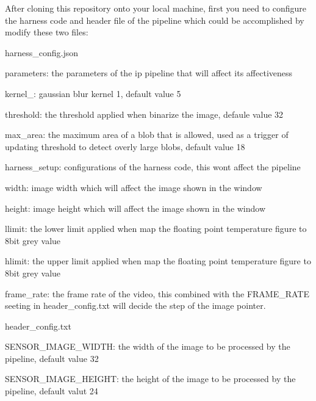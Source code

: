 After cloning this repository onto your local machine, first you need to configure the harness code and header file of the pipeline which could be accomplished by modify these two files\+:
\begin{DoxyItemize}
\item harness\+\_\+config.\+json
\begin{DoxyItemize}
\item parameters\+: the parameters of the ip pipeline that will affect its affectiveness
\begin{DoxyItemize}
\item kernel\+\_\+: gaussian blur kernel 1, default value 5
\item threshold\+: the threshold applied when binarize the image, defaule value 32
\item max\+\_\+area\+: the maximum area of a blob that is allowed, used as a trigger of updating threshold to detect overly large blobs, default value 18
\end{DoxyItemize}
\item harness\+\_\+setup\+: configurations of the harness code, this won\textquotesingle{}t affect the pipeline
\begin{DoxyItemize}
\item width\+: image width which will affect the image shown in the window
\item height\+: image height which will affect the image shown in the window
\item llimit\+: the lower limit applied when map the floating point temperature figure to 8bit grey value
\item hlimit\+: the upper limit applied when map the floating point temperature figure to 8bit grey value
\item frame\+\_\+rate\+: the frame rate of the video, this combined with the F\+R\+A\+M\+E\+\_\+\+R\+A\+TE seeting in header\+\_\+config.\+txt will decide the step of the image pointer.
\end{DoxyItemize}
\end{DoxyItemize}
\item header\+\_\+config.\+txt
\begin{DoxyItemize}
\item S\+E\+N\+S\+O\+R\+\_\+\+I\+M\+A\+G\+E\+\_\+\+W\+I\+D\+TH\+: the width of the image to be processed by the pipeline, default value 32
\item S\+E\+N\+S\+O\+R\+\_\+\+I\+M\+A\+G\+E\+\_\+\+H\+E\+I\+G\+HT\+: the height of the image to be processed by the pipeline, default valut 24

\end{DoxyItemize}
\end{DoxyItemize}
